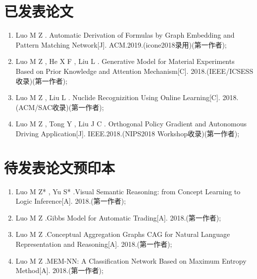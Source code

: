 ﻿\begin{publications}

\section*{已发表论文}

\begin{enumerate}
\item Luo M Z . Automatic Derivation of Formulas by Graph Embedding and Pattern Matching Network[J]. ACM.2019.(icone2018录用)(第一作者);
\item Luo M Z , He X F , Liu L . Generative Model for Material Experiments Based on Prior Knowledge and Attention Mechanism[C]. 2018.(IEEE/ICSESS收录)(第一作者);
\item Luo M Z , Liu L . Nuclide Recognizition Using Online Learning[C]. 2018.(ACM/SAC收录)(第一作者);
\item Luo M Z , Tong Y , Liu J C . Orthogonal Policy Gradient and Autonomous Driving Application[J]. IEEE.2018.(NIPS2018 Workshop收录)(第一作者);
\end{enumerate}

\section*{待发表论文预印本}

\begin{enumerate}
\item Luo M Z* , Yu S* .Visual Semantic Reasoning: from Concept Learning to Logic Inference[A]. 2018.(第一作者);
\item Luo M Z .Gibbs Model for Automatic Trading[A]. 2018.(第一作者);
\item Luo M Z .Conceptual Aggregation Graphs CAG for Natural Language Representation and Reasoning[A]. 2018.(第一作者);
\item Luo M Z .MEM-NN: A Classification Network Based on Maximum Entropy Method[A]. 2018.(第一作者);
\end{enumerate}


\end{publications}
